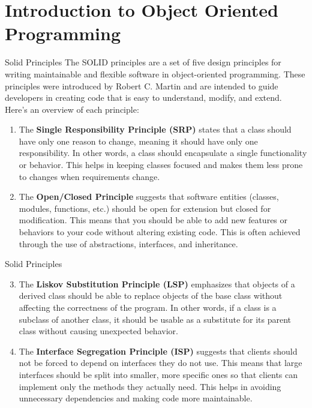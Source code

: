 \section{Introduction to Object Oriented Programming}

\begin{frame}
    \begin{content}{Solid Principles}
        The SOLID principles are a set of five design principles for writing maintainable and flexible software in object-oriented programming. These principles were introduced by Robert C. Martin and are intended to guide developers in creating code that is easy to understand, modify, and extend. Here's an overview of each principle:
        \begin{enumerate}
            \item The \textbf{Single Responsibility Principle (SRP)} states that a class should have only one reason to change, meaning it should have only one responsibility. In other words, a class should encapsulate a single functionality or behavior. This helps in keeping classes focused and makes them less prone to changes when requirements change.
            \item The \textbf{Open/Closed Principle} suggests that software entities (classes, modules, functions, etc.) should be open for extension but closed for modification. This means that you should be able to add new features or behaviors to your code without altering existing code. This is often achieved through the use of abstractions, interfaces, and inheritance.
        \end{enumerate}
    \end{content}
\end{frame}
\begin{frame}
    \begin{content}{Solid Principles}
        \begin{enumerate}
            \setcounter{enumi}{2}
            \item The \textbf{Liskov Substitution Principle (LSP)} emphasizes that objects of a derived class should be able to replace objects of the base class without affecting the correctness of the program. In other words, if a class is a subclass of another class, it should be usable as a substitute for its parent class without causing unexpected behavior.
            \item The \textbf{Interface Segregation Principle (ISP)} suggests that clients should not be forced to depend on interfaces they do not use. This means that large interfaces should be split into smaller, more specific ones so that clients can implement only the methods they actually need. This helps in avoiding unnecessary dependencies and making code more maintainable.
        \end{enumerate}
    \end{content}
\end{frame}
